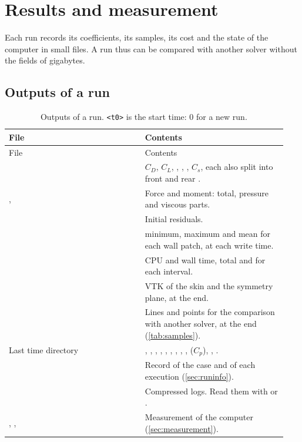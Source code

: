 \chapter{Results and measurement}\label{ch:results}

Each run records its coefficients, its samples, its cost and the state of the
computer in small files. A run thus can be compared with another solver without the
fields of gigabytes.

\section{Outputs of a run}\label{sec:outputs}

\begin{longtable}{@{}P{0.46\linewidth} P{0.48\linewidth}@{}}
\caption{Outputs of a run. \texttt{<t0>} is the start time: 0 for a new run.}\label{tab:outputs}\\
\toprule
File & Contents \\
\midrule
\endfirsthead
\toprule
File & Contents \\
\midrule
\endhead
{} & $C_D$, $C_L$, , , , $C_s$, each also split into front  and rear . \\
,  & Force and moment: total, pressure and viscous parts. \\
 & Initial residuals. \\
 & \yplus{} minimum, maximum and mean for each wall patch, at each write time. \\
 & CPU and wall time, total and for each interval. \\
 & VTK of the skin and the symmetry plane, at the end. \\
 & Lines and points for the comparison with another solver, at the end (\cref{tab:samples}). \\
Last time directory & , , , , , , , , ,  ($C_p$), , . \\
 & Record of the case and of each execution (\cref{sec:runinfo}). \\
 & Compressed logs. Read them with  or . \\
, ,  & Measurement of the computer (\cref{sec:measurement}). \\
\bottomrule
\end{longtable}

